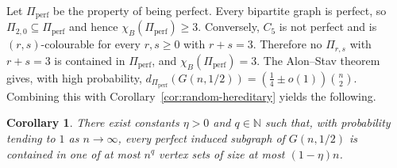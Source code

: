 \documentclass[11pt,reqno,letterpaper]{amsart}
\newcommand{\N}{{\mathbb N}}
\theoremstyle{plain}
\newtheorem{cor}[thm]{Corollary}
\theoremstyle{remark}
\begin{document}
Let $\Pi_{\mathrm{perf}}$ be the property of being perfect.  Every bipartite
graph is perfect, so $\Pi_{2,0}\subseteq\Pi_{\mathrm{perf}}$ and hence
$\chi_B(\Pi_{\mathrm{perf}})\geq3$.  Conversely, $C_5$ is not perfect and is
$(r,s)$-colourable for every $r,s\geq0$ with $r+s=3$.  Therefore no
$\Pi_{r,s}$ with $r+s=3$ is contained in $\Pi_{\mathrm{perf}}$, and
$\chi_B(\Pi_{\mathrm{perf}})=3$.  The Alon--Stav theorem gives, with high
probability,
\(d_{\Pi_{\mathrm{perf}}}(G(n,1/2)) =\left(\frac14\pm o(1)\right)\binom n2.\)
Combining this with Corollary~\ref{cor:random-hereditary} yields the following.

\begin{cor}\label{cor:perfectness}
There exist constants $\eta>0$ and $q\in\N$ such that, with probability
tending to $1$ as $n\to\infty$, every perfect induced subgraph of
$G(n,1/2)$ is contained in one of at most $n^q$ vertex sets of size at most
$(1-\eta)n$.
\end{cor}

\printbibliography
\end{document}

